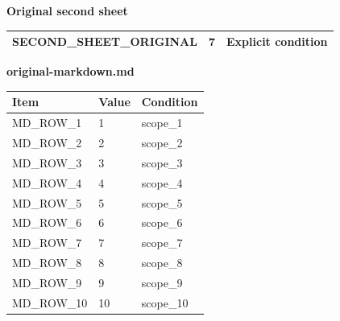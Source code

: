 \documentclass[11pt]{article}
\begin{document}
\par\noindent\begin{minipage}{\linewidth}
\par\noindent\textbf{Original second sheet}\par\smallskip\noindent
\begingroup\small
\setlength{\tabcolsep}{3pt}
\begin{tabular}{|p{}|p{}|p{}|}
\hline
SECOND\_SHEET\_ORIGINAL & 7 & Explicit condition \\ \hline
\end{tabular}
\endgroup
\end{minipage}\par
\par\noindent\begin{minipage}{\linewidth}
\par\noindent\textbf{original-markdown.md}\par\smallskip\noindent
\begingroup\small
\setlength{\tabcolsep}{3pt}
\begin{tabular}{|p{}|p{}|p{}|}
\hline
Item & Value & Condition \\ \hline
MD\_ROW\_1 & 1 & scope\_1 \\ \hline
MD\_ROW\_2 & 2 & scope\_2 \\ \hline
MD\_ROW\_3 & 3 & scope\_3 \\ \hline
MD\_ROW\_4 & 4 & scope\_4 \\ \hline
MD\_ROW\_5 & 5 & scope\_5 \\ \hline
MD\_ROW\_6 & 6 & scope\_6 \\ \hline
MD\_ROW\_7 & 7 & scope\_7 \\ \hline
MD\_ROW\_8 & 8 & scope\_8 \\ \hline
MD\_ROW\_9 & 9 & scope\_9 \\ \hline
MD\_ROW\_10 & 10 & scope\_10 \\ \hline
\end{tabular}
\endgroup
\end{minipage}\par
\end{document}
